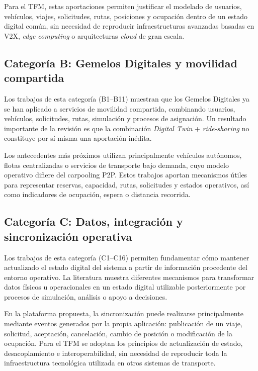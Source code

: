 Para el TFM, estas aportaciones permiten justificar el modelado de usuarios, vehículos, viajes, solicitudes, rutas, posiciones y ocupación dentro de un estado digital común, sin necesidad de reproducir infraestructuras avanzadas basadas en V2X, \textit{edge computing} o arquitecturas \textit{cloud} de gran escala.

\subsection{Categoría B: Gemelos Digitales y movilidad compartida}

Los trabajos de esta categoría (B1--B11) \cite{B1,B2,B3,B4,B5,B6,B7,B8,B9,B10,B11} muestran que los Gemelos Digitales ya se han aplicado a servicios de movilidad compartida, combinando usuarios, vehículos, solicitudes, rutas, simulación y procesos de asignación. Un resultado importante de la revisión es que la combinación \textit{Digital Twin} + \textit{ride-sharing} no constituye por sí misma una aportación inédita. 

Los antecedentes más próximos utilizan principalmente vehículos autónomos, flotas centralizadas o servicios de transporte bajo demanda, cuyo modelo operativo difiere del carpooling P2P. Estos trabajos aportan mecanismos útiles para representar reservas, capacidad, rutas, solicitudes y estados operativos, así como indicadores de ocupación, espera o distancia recorrida.

\subsection{Categoría C: Datos, integración y sincronización operativa}

Los trabajos de esta categoría (C1--C16) \cite{C1,C2,C3,C4,C5,C6,C7,C8,C9,C10,C11,C12,C13,C14,C15,C16} permiten fundamentar cómo mantener actualizado el estado digital del sistema a partir de información procedente del entorno operativo. La literatura muestra diferentes mecanismos para transformar datos físicos u operacionales en un estado digital utilizable posteriormente por procesos de simulación, análisis o apoyo a decisiones.

En la plataforma propuesta, la sincronización puede realizarse principalmente mediante eventos generados por la propia aplicación: publicación de un viaje, solicitud, aceptación, cancelación, cambio de posición o modificación de la ocupación. Para el TFM se adoptan los principios de actualización de estado, desacoplamiento e interoperabilidad, sin necesidad de reproducir toda la infraestructura tecnológica utilizada en otros sistemas de transporte.

